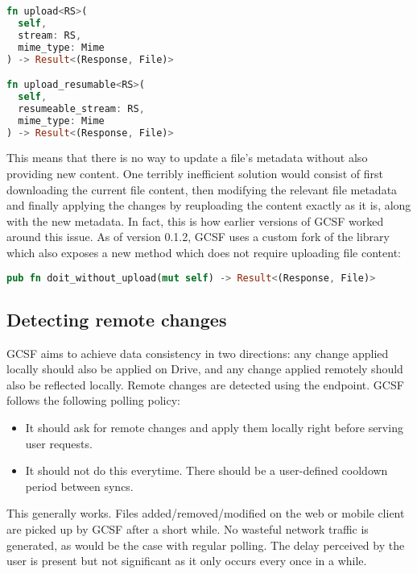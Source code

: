 \begin{lstlisting}[language=Rust, frame=single]
fn upload<RS>(
  self,
  stream: RS,
  mime_type: Mime
) -> Result<(Response, File)>

fn upload_resumable<RS>(
  self,
  resumeable_stream: RS,
  mime_type: Mime
) -> Result<(Response, File)>
\end{lstlisting}

This means that there is no way to update a file's metadata without also providing new content. One terribly inefficient solution would consist of first downloading the current file content, then modifying the relevant file metadata and finally applying the changes by reuploading the content exactly as it is, along with the new metadata. In fact, this is how earlier versions of GCSF worked around this issue. As of version 0.1.2, GCSF uses a custom fork\cite{google_drive3_fork} of the library which also exposes a new method which does not require uploading file content:

\begin{lstlisting}[language=Rust, frame=single]
pub fn doit_without_upload(mut self) -> Result<(Response, File)>
\end{lstlisting}

\subsection{Detecting remote changes}

GCSF aims to achieve data consistency in two directions: any change applied locally should also be applied on Drive, and any change applied remotely should also be reflected locally. Remote changes are detected using the  endpoint. GCSF follows the following polling policy:

\begin{itemize}
  \item It should ask for remote changes and apply them locally right before serving user requests.
  \item It should not do this everytime. There should be a user-defined cooldown period between syncs.
\end{itemize}

This generally works. Files added/removed/modified on the web or mobile client are picked up by GCSF after a short while. No wasteful network traffic is generated, as would be the case with regular polling. The delay perceived by the user is present but not significant as it only occurs every once in a while.

